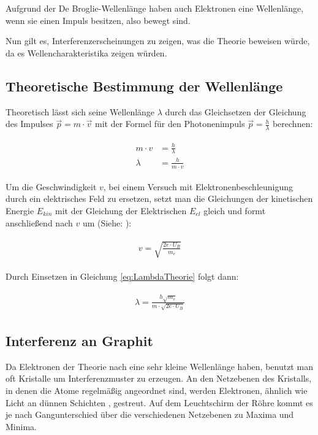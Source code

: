 Aufgrund der De Broglie-Wellenlänge haben auch Elektronen eine Wellenlänge, wenn sie einen Impuls besitzen, also bewegt sind.

Nun gilt es, Interferenzerscheinungen zu zeigen, was die Theorie beweisen würde, da es Wellencharakteristika zeigen würden.

\subsection{Theoretische Bestimmung der Wellenlänge}

Theoretisch lässt sich seine Wellenlänge $\lambda$ durch das Gleichsetzen der Gleichung des Impulses $\vec{p}=m\cdot\vec{v}$ mit der Formel für den Photonenimpuls $\vec{p}=\frac{h}{\lambda}$ berechnen:

\begin{align}	\label{eq:LambdaTheorie}
\begin{split}
	m \cdot v &= \frac{h}{\lambda} \\
	\lambda &= \frac{h}{m \cdot v}
\end{split}
\end{align}

Um die Geschwindigkeit $v$, bei einem Versuch mit Elektronenbeschleunigung durch ein elektrisches Feld zu ersetzen, setzt man die Gleichungen der kinetischen Energie $E_{kin}$ mit der Gleichung der Elektrischen $E_{el}$ gleich und formt anschließend nach $v$ um (Siehe: ):

\begin{align}
\begin{split}
	v = \sqrt{\frac{2e \cdot U_B}{m_e}}
\end{split}
\end{align}

\noindent Durch Einsetzen in Gleichung \ref{eq:LambdaTheorie} folgt dann:

\begin{align}
\begin{split}
	\lambda = \frac{h \sqrt{m_e}}{m \cdot \sqrt{2e \cdot U_B}}
\end{split}
\end{align}

\subsection{Interferenz an Graphit}

Da Elektronen der Theorie nach eine sehr kleine Wellenlänge haben, benutzt man oft Kristalle um Interferenzmuster zu erzeugen. An den Netzebenen des Kristalls, in denen die Atome regelmäßig angeordnet sind, werden Elektronen, ähnlich wie Licht an dünnen Schichten%
, gestreut. Auf dem Leuchtschirm der Röhre kommt es je nach Gangunterschied über die verschiedenen Netzebenen zu Maxima und Minima.

